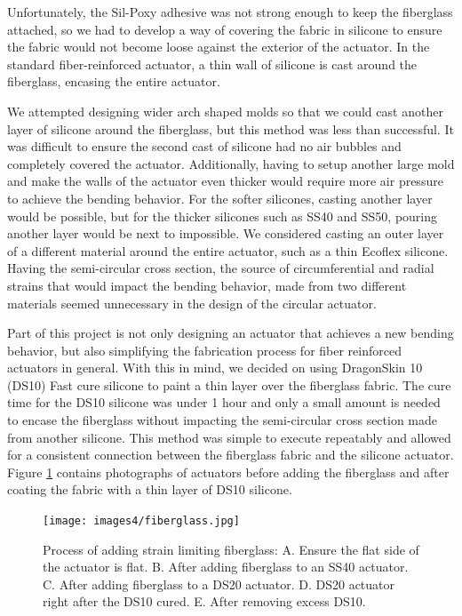 Unfortunately, the Sil-Poxy adhesive was not strong enough to keep the fiberglass attached, so we had to develop a way of covering the fabric in silicone to ensure the fabric would not become loose against the exterior of the actuator. In the standard fiber-reinforced actuator, a thin wall of silicone is cast around the fiberglass, encasing the entire actuator. 

We attempted designing wider arch shaped molds so that we could cast another layer of silicone around the fiberglass, but this method was less than successful. It was difficult to ensure the second cast of silicone had no air bubbles and completely covered the actuator. Additionally, having to setup another large mold and make the walls of the actuator even thicker would require more air pressure to achieve the bending behavior. For the softer silicones, casting another layer would be possible, but for the thicker silicones such as SS40 and SS50, pouring another layer would be next to impossible. We considered casting an outer layer of a different material around the entire actuator, such as a thin Ecoflex silicone. Having the semi-circular cross section, the source of circumferential and radial strains that would impact the bending behavior, made from two different materials seemed unnecessary in the design of the circular actuator. 

Part of this project is not only designing an actuator that achieves a new bending behavior, but also simplifying the fabrication process for fiber reinforced actuators in general. With this in mind, we decided on using DragonSkin 10 (DS10) Fast cure silicone to paint a thin layer over the fiberglass fabric. The cure time for the DS10 silicone was under 1 hour and only a small amount is needed to encase the fiberglass without impacting the semi-circular cross section made from another silicone. This method was simple to execute repeatably and allowed for a consistent connection between the fiberglass fabric and the silicone actuator. Figure \ref{fig:fiberglass} contains photographs of actuators before adding the fiberglass and after coating the fabric with a thin layer of DS10 silicone. 

\begin{figure}[h!]
    \centering
    \texttt{[image: images4/fiberglass.jpg]}
    \caption{Process of adding strain limiting fiberglass: A. Ensure the flat side of the actuator is flat. B. After adding fiberglass to an SS40 actuator. C. After adding fiberglass to a DS20 actuator. D. DS20 actuator right after the DS10 cured. E. After removing excess DS10.}
    \label{fig:fiberglass}
\end{figure}

